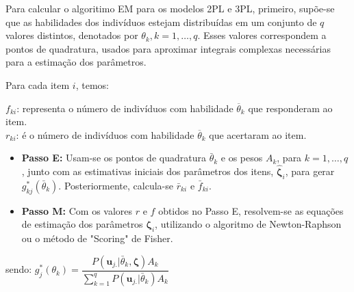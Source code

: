 Para calcular o algoritimo EM para os modelos 2PL e 3PL, primeiro, supõe-se que as habilidades dos indivíduos estejam distribuídas em um conjunto de $q$ valores distintos, denotados por 
$\theta_k, k = 1, \dots, q$. Esses valores correspondem a pontos de quadratura, usados para aproximar integrais complexas necessárias para a estimação dos parâmetros.

Para cada item $i$, temos:

\noindent $f_{ki}$: representa o número de indivíduos com habilidade $\overline{\theta}_k$ que responderam ao item.\\
\noindent $r_{ki}$: é o número de indivíduos com habilidade $\overline{\theta}_k$ que acertaram ao item. 

	
\begin{itemize}
	\item[] \textbf{Passo E:} Usam-se os pontos de quadratura $\bar{\theta}_k$ e os pesos \(A_k\), para $k = 1, \dots, q$, junto com as estimativas iniciais dos parâmetros dos itens, $\boldsymbol{\hat{\zeta}}_i$, para gerar \(g_{kj}^*(\bar{\theta}_k)\). Posteriormente, calcula-se \(\bar{r}_{ki}\) e \(\bar{f}_{ki}\).
	
	\item[] \textbf{Passo M:} Com os valores $r$ e $f$ obtidos no Passo E, resolvem-se as equações de estimação dos parâmetros $\boldsymbol{\zeta}_i$, utilizando o algoritmo de Newton-Raphson ou o método de "Scoring" de Fisher.
\end{itemize}

sendo:  \(
	g^*_j(\theta_k) = \dfrac{ P(\boldsymbol{u}_{j.}|\bar{\theta}_k, \boldsymbol{\zeta})A_k
	}{\sum_{k=1}^{q}P(\boldsymbol{u}_{j.}|\bar{\theta}_k)A_k}
\)
	
